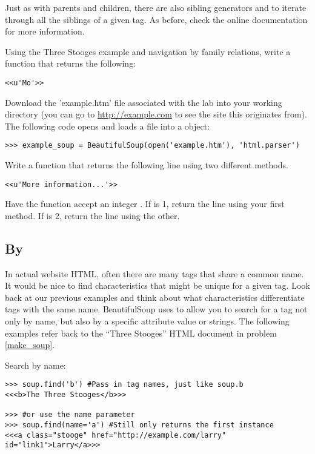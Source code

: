 Just as with parents and children, there are also sibling generators  and  to iterate through all the siblings of a given tag.
As before, check the online documentation for more information.

\begin{problem}
Using the Three Stooges example and navigation by family relations, write a function that returns the following:
\begin{lstlisting}
<<u'Mo'>>
\end{lstlisting}
\end{problem}

\begin{problem}
Download the 'example.htm' file associated with the lab into your working directory (you can go to \url{http://example.com} to see the site this originates from).
The following code opens and loads a file into a  object:
\begin{lstlisting}
>>> example_soup = BeautifulSoup(open('example.htm'), 'html.parser')
\end{lstlisting}
Write a function that returns the following line using two different methods.
\begin{lstlisting}
<<u'More information...'>>
\end{lstlisting}
Have the function accept an integer . If  is 1, return the line using your first method.
If  is 2, return the line using the other.
\end{problem}

\subsection*{By }

In actual website HTML, often there are many tags that share a common name.
It would be nice to find characteristics that might be unique for a given tag.
Look back at our previous examples and think about what characteristics differentiate tags with the same name.
BeautifulSoup uses  to allow you to search for a tag not only by name, but also by a specific attribute value or strings.
The following examples refer back to the ``Three Stooges'' HTML document in problem \ref{make_soup}.

Search by name:
\begin{lstlisting}
>>> soup.find('b') #Pass in tag names, just like soup.b
<<<b>The Three Stooges</b>>>

>>> #or use the name parameter
>>> soup.find(name='a') #Still only returns the first instance
<<<a class="stooge" href="http://example.com/larry" id="link1">Larry</a>>>

\end{lstlisting}

